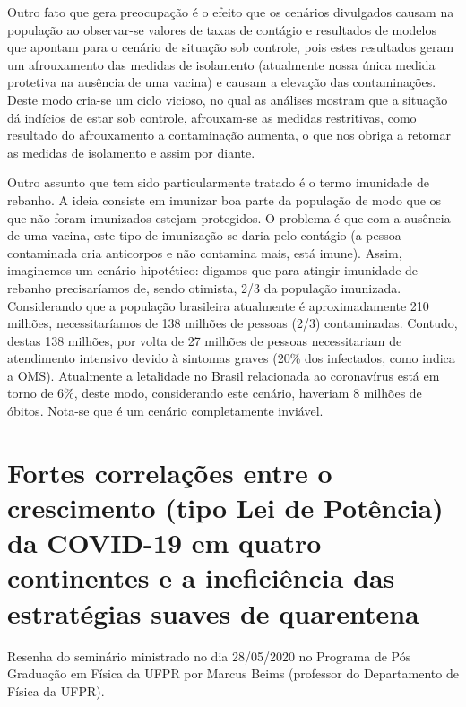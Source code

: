 \documentclass[
	12pt,				%
	openright,			%
	twoside,			%
	a4paper,			%
	english,			%
	brazil,				%
	svgnames
	]{abntex2}\usepackage[]{graphicx}\usepackage[]{color}
\begin{document}
Outro fato que gera preocupação é o efeito que os cenários divulgados causam na população ao observar-se valores de taxas de contágio e resultados de modelos que apontam para o cenário de situação sob controle, pois estes resultados geram um afrouxamento das medidas de isolamento (atualmente nossa única medida protetiva na ausência de uma vacina) e causam a elevação das contaminações. Deste modo cria-se um ciclo vicioso, no qual as análises mostram que a situação dá indícios de estar sob controle, afrouxam-se as medidas restritivas, como resultado do afrouxamento a contaminação aumenta, o que nos obriga a retomar as medidas de isolamento e assim por diante.



Outro assunto que tem sido particularmente tratado é o termo imunidade de rebanho. A ideia consiste em imunizar boa parte da população de modo que os que não foram imunizados estejam protegidos. O problema é que com a ausência de uma vacina, este tipo de imunização se daria pelo contágio (a pessoa contaminada cria anticorpos e não contamina mais, está imune). Assim, imaginemos um cenário hipotético: digamos que para atingir imunidade de rebanho precisaríamos de, sendo otimista, 2/3 da população imunizada. Considerando que a população brasileira atualmente é aproximadamente 210 milhões, necessitaríamos de 138 milhões de pessoas (2/3) contaminadas. Contudo, destas 138 milhões,  por volta de 27 milhões de pessoas necessitariam de atendimento intensivo devido à sintomas graves (20\% dos infectados, como indica a OMS). Atualmente a letalidade no Brasil relacionada ao coronavírus está em torno de 6\%, deste modo, considerando este cenário, haveriam 8 milhões de óbitos. Nota-se que é um cenário completamente inviável.



\chapter{Fortes correlações entre o crescimento (tipo Lei de Potência) da COVID-19 em quatro continentes e a ineficiência das estratégias suaves de quarentena}
\label{cap:res2}


Resenha do seminário ministrado no dia 28/05/2020 no Programa de Pós Graduação em Física da UFPR por Marcus Beims (professor do Departamento de Física da UFPR).
\end{document}
